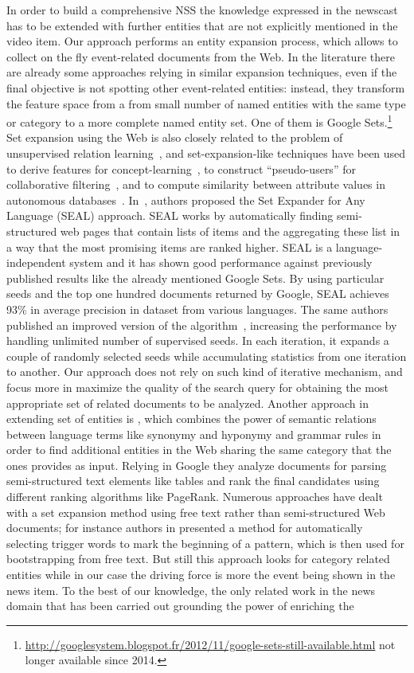 \documentclass{llncs}
\begin{document}
In order to build a comprehensive NSS the knowledge expressed in the newscast has to be extended with further entities that are not explicitly mentioned in the video item. Our approach performs an entity expansion process, which allows to collect on the fly event-related documents from the Web. In the literature there are already some approaches relying in similar expansion techniques, even if the final objective is not spotting other event-related entities: instead, they transform the feature space from a from small number of named entities with the same type or category to a more complete named entity set. One of them is Google Sets.\footnote{\url{http://googlesystem.blogspot.fr/2012/11/google-sets-still-available.html} not longer available since 2014.} Set expansion using the Web is also closely related to the problem of unsupervised relation learning~\cite{Cafarella2005}, and set-expansion-like techniques have been used to derive features for concept-learning~\cite{Cohen2000}, to construct ``pseudo-users'' for collaborative filtering~\cite{Cohen99}, and to compute similarity between attribute values in autonomous databases~\cite{Wolf2007}. In~\cite{Wang2007}, authors proposed the Set Expander for Any Language (SEAL) approach. SEAL works by automatically finding semi-structured web pages that contain lists of items and the aggregating these list in a way that the most promising items are ranked higher. SEAL is a language-independent system and it has shown good performance against previously published results like the already mentioned Google Sets. By using particular seeds and the top one hundred documents returned by Google, SEAL achieves 93\% in average precision in dataset from various languages. The same authors published an improved version of the algorithm~\cite{Wang2008}, increasing the performance by handling unlimited number of supervised seeds. In each iteration, it expands a couple of randomly selected seeds while accumulating statistics from one iteration to another. Our approach does not rely on such kind of iterative mechanism, and focus more in maximize the quality of the search query for obtaining the most appropriate set of related documents to be analyzed. Another approach in extending set of entities is \cite{Mai-Vu2010}, which combines the power of semantic relations between language terms like synonymy and hyponymy and grammar rules in order to find additional entities in the Web sharing the same category that the ones provides as input. Relying in Google they analyze documents for parsing semi-structured text elements like tables and rank the final candidates using different ranking algorithms like PageRank. Numerous approaches have dealt with a set expansion method using free text rather than semi-structured Web documents; for instance authors in \cite{Talukdar2006} presented a method for automatically selecting trigger words to mark the beginning of a pattern, which is then used for bootstrapping from free text. But still this approach looks for category related entities while in our case the driving force is more the event being shown in the news item. To the best of our knowledge, the only related work in the news domain that has been carried out grounding the power of enriching the 
\end{document}
